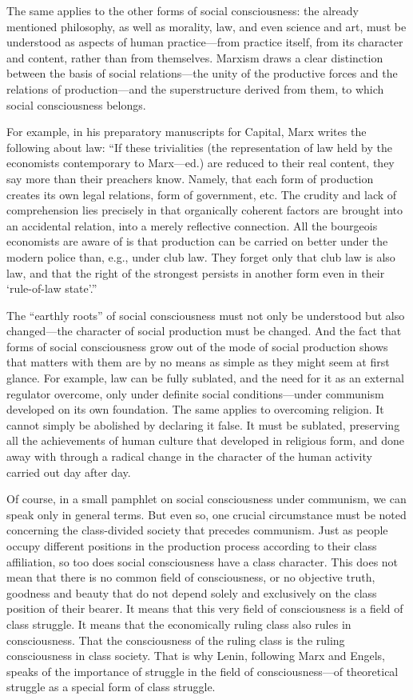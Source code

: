 \documentclass[12pt,a4paper,openany]{book}
\begin{document}
The same applies to the other forms of social consciousness: the already mentioned philosophy, as well as morality, law, and even science and art, must be understood as aspects of human practice—from practice itself, from its character and content, rather than from themselves. Marxism draws a clear distinction between the basis of social relations—the unity of the productive forces and the relations of production—and the superstructure derived from them, to which social consciousness belongs.

For example, in his preparatory manuscripts for Capital, Marx writes the following about law: “If these trivialities (the representation of law held by the economists contemporary to Marx—ed.) are reduced to their real content, they say more than their preachers know. Namely, that each form of production creates its own legal relations, form of government, etc. The crudity and lack of comprehension lies precisely in that organically coherent factors are brought into an accidental relation, into a merely reflective connection. All the bourgeois economists are aware of is that production can be carried on better under the modern police than, e.g., under club law. They forget only that club law is also law, and that the right of the strongest persists in another form even in their ‘rule-of-law state’.”

The “earthly roots” of social consciousness must not only be understood but also changed—the character of social production must be changed. And the fact that forms of social consciousness grow out of the mode of social production shows that matters with them are by no means as simple as they might seem at first glance. For example, law can be fully sublated, and the need for it as an external regulator overcome, only under definite social conditions—under communism developed on its own foundation. The same applies to overcoming religion. It cannot simply be abolished by declaring it false. It must be sublated, preserving all the achievements of human culture that developed in religious form, and done away with through a radical change in the character of the human activity carried out day after day.

Of course, in a small pamphlet on social consciousness under communism, we can speak only in general terms. But even so, one crucial circumstance must be noted concerning the class-divided society that precedes communism. Just as people occupy different positions in the production process according to their class affiliation, so too does social consciousness have a class character. This does not mean that there is no common field of consciousness, or no objective truth, goodness and beauty that do not depend solely and exclusively on the class position of their bearer. It means that this very field of consciousness is a field of class struggle. It means that the economically ruling class also rules in consciousness. That the consciousness of the ruling class is the ruling consciousness in class society. That is why Lenin, following Marx and Engels, speaks of the importance of struggle in the field of consciousness—of theoretical struggle as a special form of class struggle.
\end{document}
